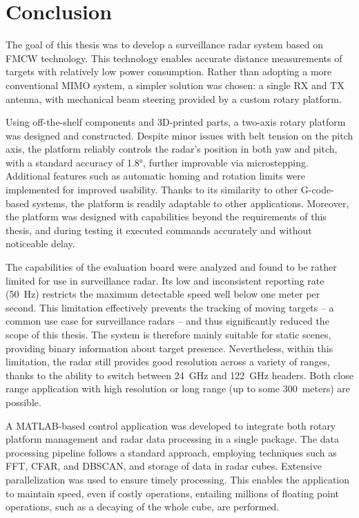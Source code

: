\chapter*{Conclusion}

The goal of this thesis was to develop a surveillance radar system based on FMCW technology.
This technology enables accurate distance measurements of targets with relatively low power consumption.
Rather than adopting a more conventional MIMO system, a simpler solution was chosen: a single RX and TX antenna, with mechanical beam steering provided by a custom rotary platform.

Using off-the-shelf components and 3D-printed parts, a two-axis rotary platform was designed and constructed.
Despite minor issues with belt tension on the pitch axis, the platform reliably controls the radar’s position in both yaw and pitch, with a standard accuracy of 1.8°, further improvable via microstepping.
Additional features such as automatic homing and rotation limits were implemented for improved usability.
Thanks to its similarity to other G-code-based systems, the platform is readily adaptable to other applications.
Moreover, the platform was designed with capabilities beyond the requirements of this thesis, and during testing it executed commands accurately and without noticeable delay.

The capabilities of the \sidar evaluation board were analyzed and found to be rather limited for use in surveillance radar.
Its low and inconsistent reporting rate (50~Hz) restricts the maximum detectable speed well below one meter per second.
This limitation effectively prevents the tracking of moving targets -- a common use case for surveillance radars -- and thus significantly reduced the scope of this thesis.
The system is therefore mainly suitable for static scenes, providing binary information about target presence.
Nevertheless, within this limitation, the radar still provides good resolution across a variety of ranges, thanks to the ability to switch between 24~GHz and 122~GHz headers.
Both close range application with high resolution or long range (up to some 300~meters) are possible.

A MATLAB-based control application was developed to integrate both rotary platform management and radar data processing in a single package.
The data processing pipeline follows a standard approach, employing techniques such as FFT, CFAR, and DBSCAN, and storage of data in radar cubes.
Extensive parallelization was used to ensure timely processing.
This enables the application to maintain speed, even if costly operations, entailing millions of floating point operations, such as a decaying of the whole cube, are performed.


